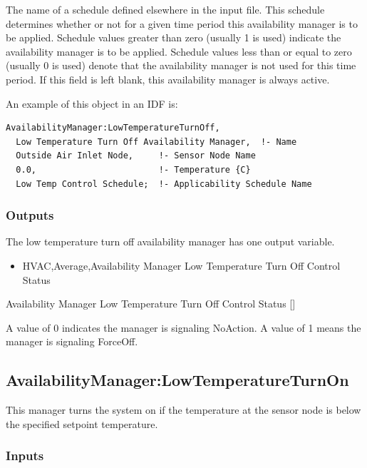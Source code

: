 The name of a schedule defined elsewhere in the input file. This schedule determines whether or not for a given time period this availability manager is to be applied. Schedule values greater than zero (usually 1 is used) indicate the availability manager is to be applied. Schedule values less than or equal to zero (usually 0 is used) denote that the availability manager is not used for this time period. If this field is left blank, this availability manager is always active.

An example of this object in an IDF is:

\begin{lstlisting}
AvailabilityManager:LowTemperatureTurnOff,
  Low Temperature Turn Off Availability Manager,  !- Name
  Outside Air Inlet Node,     !- Sensor Node Name
  0.0,                        !- Temperature {C}
  Low Temp Control Schedule;  !- Applicability Schedule Name
\end{lstlisting}

\subsubsection{Outputs}\label{outputs-6-010}

The low temperature turn off availability manager has one output variable.

\begin{itemize}
\tightlist
\item
  HVAC,Average,Availability Manager Low Temperature Turn Off Control Status
\end{itemize}

Availability Manager Low Temperature Turn Off Control Status {[]}

A value of 0 indicates the manager is signaling NoAction. A value of 1 means the manager is signaling ForceOff.

\subsection{AvailabilityManager:LowTemperatureTurnOn}\label{availabilitymanagerlowtemperatureturnon}

This manager turns the system on if the temperature at the sensor node is below the specified setpoint temperature.

\subsubsection{Inputs}\label{inputs-8-025}

